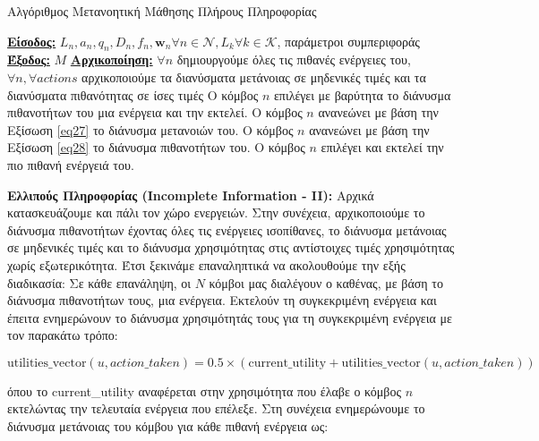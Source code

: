 \begin{algorithm}[h]
\caption{Αλγόριθμος Μετανοητική Μάθησης Πλήρους Πληροφορίας} \label{algorithm 5}
\begin{algorithmic}[1]
\STATE \textbf{\underline{Είσοδος:}} ${L_n, a_n, q_n, D_n, f_n, \mathbf{w}_n}{\forall n\in \mathcal{N}}, {L_k}{\forall k \in \mathcal{K}}$, παράμετροι συμπεριφοράς
\STATE \textbf{\underline{Έξοδος:}}  $M$
\STATE \textbf{\underline{Αρχικοποίηση:}} $\forall n$ δημιουργούμε όλες τις πιθανές ενέργειες του, $\forall n, \forall actions$ αρχικοποιούμε τα διανύσματα μετάνοιας σε μηδενικές τιμές και τα διανύσματα πιθανότητας σε ίσες τιμές
\STATE Ο κόμβος $n$ επιλέγει με βαρύτητα το διάνυσμα πιθανοτήτων του μια ενέργεια και την εκτελεί.
\ENDFOR
{}
\STATE Ο κόμβος $n$ ανανεώνει με βάση την Εξίσωση \ref{eq27} το διάνυσμα μετανοιών του.
\STATE Ο κόμβος $n$ ανανεώνει με βάση την Εξίσωση \ref{eq28} το διάνυσμα πιθανοτήτων του.
\ENDFOR
\ENDWHILE
{}
\STATE Ο κόμβος $n$ επιλέγει και εκτελεί την πιο πιθανή ενέργειά του.
\ENDFOR
\end{algorithmic}
\end{algorithm}

\textbf{Ελλιπούς Πληροφορίας (Incomplete Information - II):} Αρχικά κατασκευάζουμε και πάλι τον χώρο ενεργειών. Στην συνέχεια, αρχικοποιούμε το διάνυσμα πιθανοτήτων έχοντας όλες τις ενέργειες ισοπίθανες, το διάνυσμα μετάνοιας σε μηδενικές τιμές και το διάνυσμα χρησιμότητας στις αντίστοιχες τιμές χρησιμότητας χωρίς εξωτερικότητα. Έτσι ξεκινάμε επαναληπτικά να ακολουθούμε την εξής διαδικασία: Σε κάθε επανάληψη, οι $N$ κόμβοι μας διαλέγουν ο καθένας, με βάση το διάνυσμα πιθανοτήτων τους, μια ενέργεια. Εκτελούν τη συγκεκριμένη ενέργεια και έπειτα ενημερώνουν το διάνυσμα χρησιμότητάς τους για τη συγκεκριμένη ενέργεια με τον παρακάτω τρόπο:

\vspace{-5pt}

\begin{equation}
    \text{utilities\_vector}(u,action\_taken) = 0.5 \times \left(\text{current\_utility} + \text{utilities\_vector}(u,action\_taken)\right)
\label{eq29}
\end{equation}

\vspace{-3pt}

\noindent
όπου το current\_utility αναφέρεται στην χρησιμότητα που έλαβε ο κόμβος $n$ εκτελώντας την τελευταία ενέργεια που επέλεξε. Στη συνέχεια ενημερώνουμε το διάνυσμα μετάνοιας του κόμβου για κάθε πιθανή ενέργεια ως:

